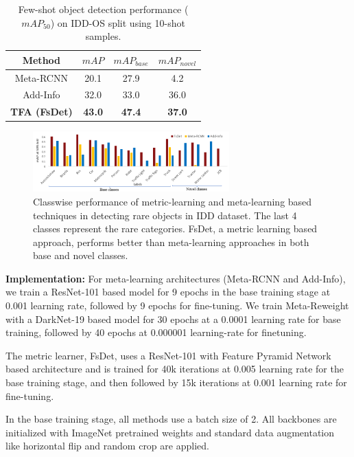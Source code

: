 \documentclass[letterpaper]{article} %
\begin{document}
\begin{table}[t]
\caption{Few-shot object detection performance ($mAP_{50}$) on IDD-OS split using 10-shot samples.}
\centering
\begin{tabular}{c|c|c|c}
\hline
Method                   & $mAP$  & $mAP_{base}$ & $mAP_{novel}$ \\
\hline
Meta-RCNN & 20.1 & 27.9         & 4.2           \\
Add-Info  & 32.0 & 33.0         & 36.0          \\
\textbf{TFA (FsDet)} & \textbf{43.0} & \textbf{47.4} & \textbf{37.0}          \\
\hline
\end{tabular}
\label{table4}
\end{table}

\begin{figure}[t]
\centering
\includegraphics[height=0.171\textwidth,width=0.675\textwidth]{accuracy_vfb.PNG}
\caption{Classwise performance of metric-learning and meta-learning based techniques in detecting rare objects in IDD dataset. The last 4 classes represent the rare categories. FsDet, a metric learning based approach, performs better than meta-learning approaches in both base and novel classes.}
\label{vfb_classwise}
\end{figure}

\textbf{Implementation: }
For meta-learning architectures (Meta-RCNN and Add-Info), we train a ResNet-101 based model for 9 epochs in the base training stage at 0.001 learning rate, followed by 9 epochs for fine-tuning. We train Meta-Reweight with a DarkNet-19 based model for 30 epochs at a 0.0001 learning rate for base training, followed by 40 epochs at 0.000001 learning-rate for finetuning.

The metric learner, FsDet, uses a ResNet-101 with Feature Pyramid Network based architecture and is trained for 40k iterations at 0.005 learning rate for the base training stage, and then followed by 15k iterations at 0.001 learning rate for fine-tuning.

In the base training stage, all methods use a batch size of 2. All backbones are initialized with ImageNet pretrained weights and standard data augmentation like horizontal flip and random crop are applied.
\end{document}
